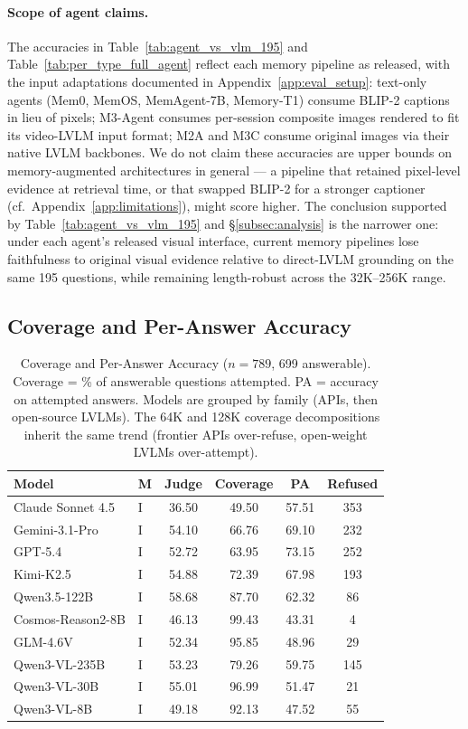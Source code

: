 \documentclass{llmxive}
\begin{document}
\paragraph{Scope of agent claims.}
The accuracies in Table~\ref{tab:agent_vs_vlm_195} and Table~\ref{tab:per_type_full_agent} reflect each memory pipeline as released, with the input adaptations documented in Appendix~\ref{app:eval_setup}: text-only agents (Mem0, MemOS, MemAgent-7B, Memory-T1) consume BLIP-2 captions in lieu of pixels; M3-Agent consumes per-session composite images rendered to fit its video-LVLM input format; M2A and M3C consume original images via their native LVLM backbones. We do not claim these accuracies are upper bounds on memory-augmented architectures in general --- a pipeline that retained pixel-level evidence at retrieval time, or that swapped BLIP-2 for a stronger captioner (cf.\ Appendix~\ref{app:limitations}), might score higher. The conclusion supported by Table~\ref{tab:agent_vs_vlm_195} and \S\ref{subsec:analysis} is the narrower one: under each agent's released visual interface, current memory pipelines lose faithfulness to original visual evidence relative to direct-LVLM grounding on the same 195 questions, while remaining length-robust across the 32K--256K range.

\subsection{Coverage and Per-Answer Accuracy}
\label{app:coverage_full}

\begin{table}[!htbp]
\centering
\small
\begin{tabular}{@{}llcccc@{}}
\toprule
\textbf{Model} & \textbf{M} & \textbf{Judge} & \textbf{Coverage} & \textbf{PA} & \textbf{Refused} \\
\midrule
Claude Sonnet 4.5 & I & 36.50 & 49.50 & 57.51 & 353 \\
Gemini-3.1-Pro & I & 54.10 & 66.76 & 69.10 & 232 \\
GPT-5.4 & I & 52.72 & 63.95 & 73.15 & 252 \\
Kimi-K2.5 & I & 54.88 & 72.39 & 67.98 & 193 \\
\midrule
Qwen3.5-122B & I & 58.68 & 87.70 & 62.32 & 86 \\
\midrule
Cosmos-Reason2-8B & I & 46.13 & 99.43 & 43.31 & 4 \\
\midrule
GLM-4.6V & I & 52.34 & 95.85 & 48.96 & 29 \\
\midrule
Qwen3-VL-235B & I & 53.23 & 79.26 & 59.75 & 145 \\
Qwen3-VL-30B & I & 55.01 & 96.99 & 51.47 & 21 \\
Qwen3-VL-8B & I & 49.18 & 92.13 & 47.52 & 55 \\
\bottomrule
\end{tabular}
\caption{Coverage and Per-Answer Accuracy ($n=789$, 699 answerable). Coverage = \% of answerable questions attempted. PA = accuracy on attempted answers. Models are grouped by family (APIs, then open-source LVLMs). The 64K and 128K coverage decompositions inherit the same trend (frontier APIs over-refuse, open-weight LVLMs over-attempt).}
\label{tab:coverage_full}
\end{table}
\end{document}
